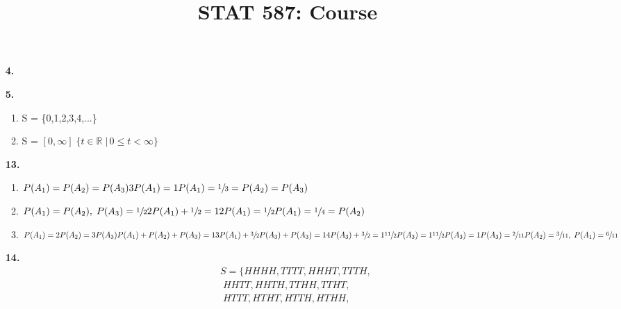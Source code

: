 \documentclass{article}
\title{STAT 587: Course \exerciseset}
\author{\studentname}
\begin{document}
\maketitle

\begin{enumerate}
\item[\textbf{4.}] 
\item[\textbf{5.}]
    \begin{enumerate}
        \item S = \{0,1,2,3,4,...\}
        \item S = \( [0,\infty] \;  \{ t \in \mathbb{R}\; |\,0 \leq t < \infty\}  \)
    \end{enumerate}
\item[\textbf{13.}]
\begin{enumerate}
        \item \(P(A_1)  = P(A_2) = P(A_3)\\ 
                3P(A_1)  = 1\\   
                P(A_1) =\sfrac{1}{3} = P(A_2) = P(A_3)\)
        \item \(P(A_1)  = P(A_2), \; P(A_3)=\sfrac{1}{2}\\ 
                2P(A_1) + \sfrac{1}{2} = 1\\
                2P(A_1) = \sfrac{1}{2}\\
                P(A_1) = \sfrac{1}{4} = P(A_2)
                \)
        \item \( P(A_1) = 2P(A_2) = 3P(A_3)\\
                P(A_1) + P(A_2) + P(A_3) = 1\\
                3P(A_1) + \sfrac{3}{2}P(A_3) + P(A_3) = 1\\
                4P(A_3) + \sfrac{3}{2} = 1\\
                \sfrac{11}{2}P(A_3) =1\\
                \sfrac{11}{2}P(A_3) = 1\\
                P(A_3) = \sfrac{2}{11}\\
               P(A_2) = \sfrac{3}{11} ,\; P(A_1) = \sfrac{6}{11}\)
    \end{enumerate}
\item[\textbf{14.}] \begin{align*} S = 
                            \{ HHHH, TTTT, HHHT, TTTH,\\
                            \;HHTT, HHTH, TTHH, TTHT,\\
                            \;HTTT, HTHT, HTTH, HTHH,\\

\end{align*}
\end{enumerate}
\end{document}
